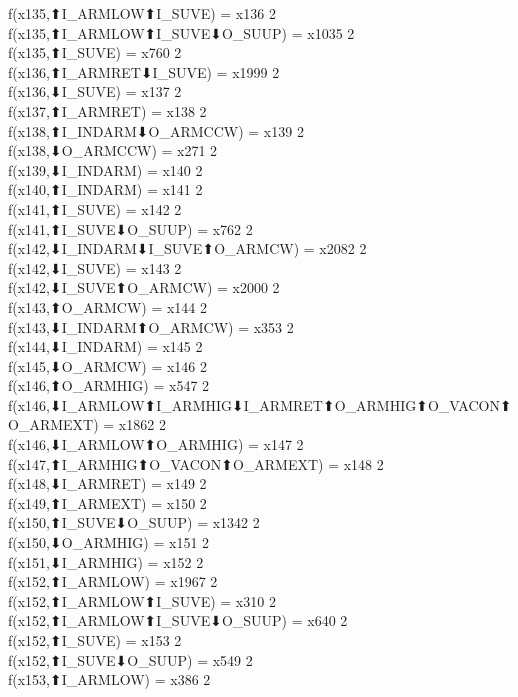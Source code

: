 f(x135,⬆I_ARMLOW⬆I_SUVE) = x136 {2} \\
f(x135,⬆I_ARMLOW⬆I_SUVE⬇O_SUUP) = x1035 {2} \\
f(x135,⬆I_SUVE) = x760 {2} \\
f(x136,⬆I_ARMRET⬇I_SUVE) = x1999 {2} \\
f(x136,⬇I_SUVE) = x137 {2} \\
f(x137,⬆I_ARMRET) = x138 {2} \\
f(x138,⬆I_INDARM⬇O_ARMCCW) = x139 {2} \\
f(x138,⬇O_ARMCCW) = x271 {2} \\
f(x139,⬇I_INDARM) = x140 {2} \\
f(x140,⬆I_INDARM) = x141 {2} \\
f(x141,⬆I_SUVE) = x142 {2} \\
f(x141,⬆I_SUVE⬇O_SUUP) = x762 {2} \\
f(x142,⬇I_INDARM⬇I_SUVE⬆O_ARMCW) = x2082 {2} \\
f(x142,⬇I_SUVE) = x143 {2} \\
f(x142,⬇I_SUVE⬆O_ARMCW) = x2000 {2} \\
f(x143,⬆O_ARMCW) = x144 {2} \\
f(x143,⬇I_INDARM⬆O_ARMCW) = x353 {2} \\
f(x144,⬇I_INDARM) = x145 {2} \\
f(x145,⬇O_ARMCW) = x146 {2} \\
f(x146,⬆O_ARMHIG) = x547 {2} \\
f(x146,⬇I_ARMLOW⬆I_ARMHIG⬇I_ARMRET⬆O_ARMHIG⬆O_VACON⬆O_ARMEXT) = x1862 {2} \\
f(x146,⬇I_ARMLOW⬆O_ARMHIG) = x147 {2} \\
f(x147,⬆I_ARMHIG⬆O_VACON⬆O_ARMEXT) = x148 {2} \\
f(x148,⬇I_ARMRET) = x149 {2} \\
f(x149,⬆I_ARMEXT) = x150 {2} \\
f(x150,⬆I_SUVE⬇O_SUUP) = x1342 {2} \\
f(x150,⬇O_ARMHIG) = x151 {2} \\
f(x151,⬇I_ARMHIG) = x152 {2} \\
f(x152,⬆I_ARMLOW) = x1967 {2} \\
f(x152,⬆I_ARMLOW⬆I_SUVE) = x310 {2} \\
f(x152,⬆I_ARMLOW⬆I_SUVE⬇O_SUUP) = x640 {2} \\
f(x152,⬆I_SUVE) = x153 {2} \\
f(x152,⬆I_SUVE⬇O_SUUP) = x549 {2} \\
f(x153,⬆I_ARMLOW) = x386 {2} \\
